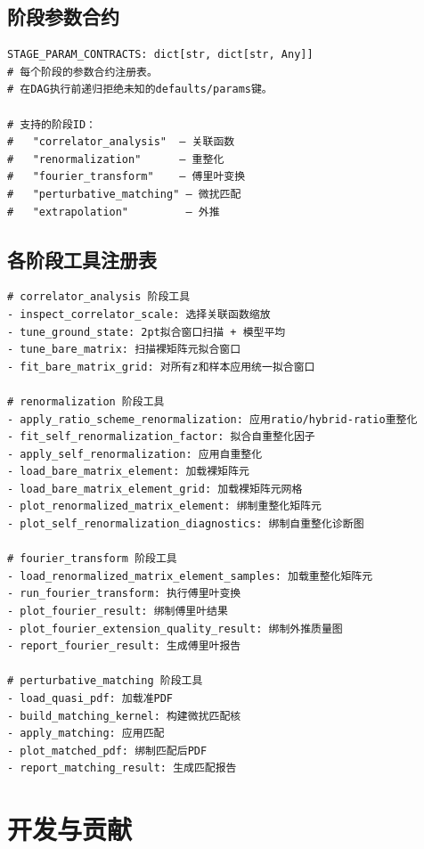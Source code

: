 \documentclass[12pt,a4paper]{ctexart}
\begin{document}
\subsection{阶段参数合约}

\begin{lstlisting}[caption={manifest\_params.py 核心接口}]
STAGE_PARAM_CONTRACTS: dict[str, dict[str, Any]]
# 每个阶段的参数合约注册表。
# 在DAG执行前递归拒绝未知的defaults/params键。

# 支持的阶段ID：
#   "correlator_analysis"  — 关联函数
#   "renormalization"      — 重整化
#   "fourier_transform"    — 傅里叶变换
#   "perturbative_matching" — 微扰匹配
#   "extrapolation"         — 外推
\end{lstlisting}

\subsection{各阶段工具注册表}

\begin{lstlisting}[caption={各阶段工具}]
# correlator_analysis 阶段工具
- inspect_correlator_scale: 选择关联函数缩放
- tune_ground_state: 2pt拟合窗口扫描 + 模型平均
- tune_bare_matrix: 扫描裸矩阵元拟合窗口
- fit_bare_matrix_grid: 对所有z和样本应用统一拟合窗口

# renormalization 阶段工具
- apply_ratio_scheme_renormalization: 应用ratio/hybrid-ratio重整化
- fit_self_renormalization_factor: 拟合自重整化因子
- apply_self_renormalization: 应用自重整化
- load_bare_matrix_element: 加载裸矩阵元
- load_bare_matrix_element_grid: 加载裸矩阵元网格
- plot_renormalized_matrix_element: 绑制重整化矩阵元
- plot_self_renormalization_diagnostics: 绑制自重整化诊断图

# fourier_transform 阶段工具
- load_renormalized_matrix_element_samples: 加载重整化矩阵元
- run_fourier_transform: 执行傅里叶变换
- plot_fourier_result: 绑制傅里叶结果
- plot_fourier_extension_quality_result: 绑制外推质量图
- report_fourier_result: 生成傅里叶报告

# perturbative_matching 阶段工具
- load_quasi_pdf: 加载准PDF
- build_matching_kernel: 构建微扰匹配核
- apply_matching: 应用匹配
- plot_matched_pdf: 绑制匹配后PDF
- report_matching_result: 生成匹配报告
\end{lstlisting}

\section{开发与贡献}
\end{document}
